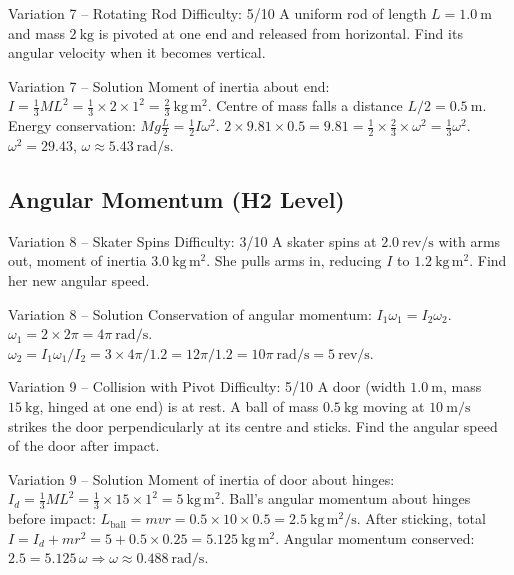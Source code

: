 \documentclass[11pt]{beamer}
\begin{document}
\begin{frame}[shrink=15]{Variation 7 – Rotating Rod \hfill Difficulty: 5/10}
A uniform rod of length $L = 1.0\ \mathrm{m}$ and mass $2\ \mathrm{kg}$ is pivoted at one end and released from horizontal. Find its angular velocity when it becomes vertical.
\end{frame}

\begin{frame}{Variation 7 – Solution}
Moment of inertia about end: $I = \frac13 ML^2 = \frac13 \times2\times1^2 = \frac23\ \mathrm{kg\,m^2}$.
Centre of mass falls a distance $L/2 = 0.5\ \mathrm{m}$. Energy conservation: $Mg\frac{L}{2} = \frac12 I \omega^2$.
$2\times9.81\times0.5 = 9.81 = \frac12 \times \frac23 \times \omega^2 = \frac13 \omega^2$.
$\omega^2 = 29.43$, $\omega \approx 5.43\ \mathrm{rad/s}$.
\end{frame}

\subsection{Angular Momentum (H2 Level)}

\begin{frame}[shrink=15]{Variation 8 – Skater Spins \hfill Difficulty: 3/10}
A skater spins at $2.0\ \mathrm{rev/s}$ with arms out, moment of inertia $3.0\ \mathrm{kg\,m^2}$. She pulls arms in, reducing $I$ to $1.2\ \mathrm{kg\,m^2}$. Find her new angular speed.
\end{frame}

\begin{frame}{Variation 8 – Solution}
Conservation of angular momentum: $I_1\omega_1 = I_2\omega_2$. $\omega_1 = 2\times2\pi = 4\pi\ \mathrm{rad/s}$.
$\omega_2 = I_1\omega_1/I_2 = 3\times4\pi/1.2 = 12\pi/1.2 = 10\pi\ \mathrm{rad/s} = 5\ \mathrm{rev/s}$.
\end{frame}

\begin{frame}[shrink=15]{Variation 9 – Collision with Pivot \hfill Difficulty: 5/10}
A door (width $1.0\ \mathrm{m}$, mass $15\ \mathrm{kg}$, hinged at one end) is at rest. A ball of mass $0.5\ \mathrm{kg}$ moving at $10\ \mathrm{m/s}$ strikes the door perpendicularly at its centre and sticks. Find the angular speed of the door after impact.
\end{frame}

\begin{frame}{Variation 9 – Solution}
Moment of inertia of door about hinges: $I_d = \frac13 M L^2 = \frac13 \times15\times1^2 = 5\ \mathrm{kg\,m^2}$.
Ball's angular momentum about hinges before impact: $L_{\text{ball}} = m v r = 0.5\times10\times0.5 = 2.5\ \mathrm{kg\,m^2/s}$.
After sticking, total $I = I_d + m r^2 = 5 + 0.5\times0.25 = 5.125\ \mathrm{kg\,m^2}$.
Angular momentum conserved: $2.5 = 5.125\,\omega \Rightarrow \omega \approx 0.488\ \mathrm{rad/s}$.
\end{frame}
\end{document}
